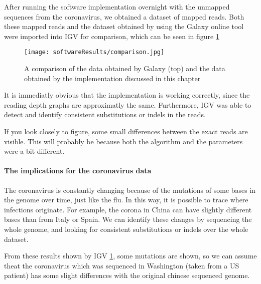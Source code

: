 After running the software implementation overnight with the unmapped sequences from the coronavirus, we obtained a dataset of mapped reads. Both these mapped reads and the dataset obtained by using the Galaxy online tool were imported into IGV for comparison, which can be seen in figure \ref{fig:IGVcomparison}

\begin{figure}[H]
	\centering
	\texttt{[image: softwareResults/comparison.jpg]}
	\caption{A comparison of the data obtained by Galaxy (top) and the data obtained by the implementation discussed in this chapter}
	\label{fig:IGVcomparison}
\end{figure}

It is immediatly obvious that the implementation is working correctly, since the reading depth graphs are approximatly the same. Furthermore, IGV was able to detect and identify consistent substitutions or indels in the reads.

If you look closely to figure, some small differences between the exact reads are visible. This will probably be because both the algorithm and the parameters were a bit different.


\paragraph{The implications for the coronavirus data}
The coronavirus is constantly changing because of the mutations of some bases in the genome over time, just like the flu. In this way, it is possible to trace where infections originate. For example, the corona in China can have slightly different bases than from Italy or Spain. We can identify these changes by sequencing the whole genome, and looking for consistent substitutions or indels over the whole dataset.

From these results shown by IGV \ref{fig:IGVcomparison}, some mutations are shown, so we can assume theat the coronavirus which was sequenced in Washington (taken from a US patient) has some slight differences with the original chinese sequenced genome.
